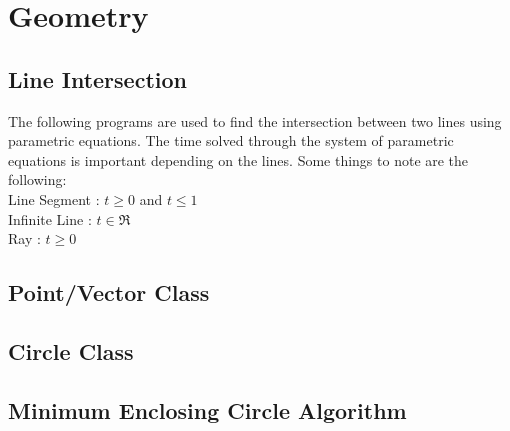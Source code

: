 
\chapter{Geometry}
\chapterinfo{}
	\section{Line Intersection}
	
	The following programs are used to find the intersection between two lines 
	using parametric equations. The time solved through the system of parametric 
	equations is important depending on the lines. Some things to note are the 
	following:\\
	\indent Line Segment : $t \ge 0 $ and $t \le 1$ \\
	\indent Infinite Line : $t \in \Re$ \\
	\indent Ray : $t \ge 0$ \\
	
	
	
	\section{Point/Vector Class}
	
	
	
	\section{Circle Class}
	
	
	
	\section{Minimum Enclosing Circle Algorithm}
	
	
	
